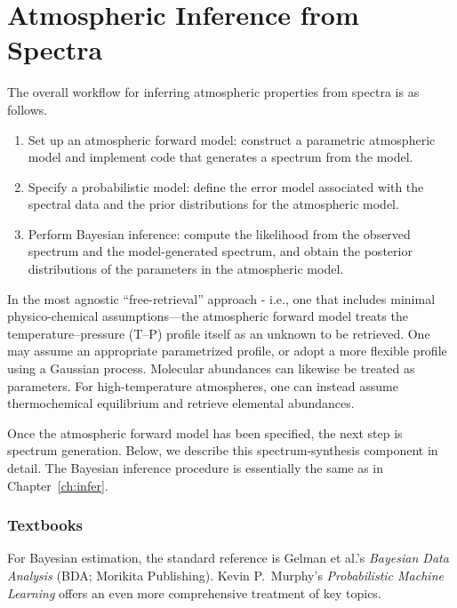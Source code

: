 \documentclass[a4paper,twocolumn]{report}
\begin{document}
\chapter{Atmospheric Inference from Spectra}

The overall workflow for inferring atmospheric properties from spectra is as follows.
\begin{enumerate}
    \item Set up an atmospheric forward model: construct a parametric atmospheric model and implement code that generates a spectrum from the model.
    \item Specify a probabilistic model: define the error model associated with the spectral data and the prior distributions for the atmospheric model.
    \item Perform Bayesian inference: compute the likelihood from the observed spectrum and the model-generated spectrum, and obtain the posterior distributions of the parameters in the atmospheric model.
\end{enumerate}

In the most agnostic ``free-retrieval'' approach - i.e., one that includes minimal physico-chemical assumptions—the atmospheric forward model treats the temperature–pressure (T–P) profile itself as an unknown to be retrieved. One may assume an appropriate parametrized profile, or adopt a more flexible profile using a Gaussian process. Molecular abundances can likewise be treated as parameters. For high-temperature atmospheres, one can instead assume thermochemical equilibrium and retrieve elemental abundances.

Once the atmospheric forward model has been specified, the next step is spectrum generation. Below, we describe this spectrum-synthesis component in detail. The Bayesian inference procedure is essentially the same as in Chapter~\ref{ch:infer}.









%
%

\footnotesize
{}

\subsection*{Textbooks}

For Bayesian estimation, the standard reference is Gelman et al.'s \textit{Bayesian Data Analysis} (BDA; Morikita Publishing). Kevin P.~Murphy's \textit{Probabilistic Machine Learning} offers an even more comprehensive treatment of key topics.



\end{document}
